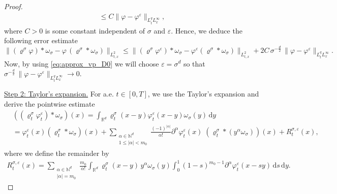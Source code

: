 \documentclass[reqno, 11pt]{amsart}
\numberwithin{equation}{section}
\theoremstyle{definition}
\begin{document}
\begin{proof}
\begin{align*}
        \leq C\|\varphi-\varphi^\varepsilon\|_{L_t^q L_x^\infty},
    \end{align*}
    where $C>0$ is some constant independent of $\sigma$ and $\varepsilon$. Hence, we deduce the following error estimate
    \begin{equation}\label{eq:commutator_proof_before_Taylors_expansion_regularization}
        \|(\varrho^\sigma\varphi)\ast\omega_\sigma-\varphi\,(\varrho^\sigma\ast\omega_\sigma)\|_{L_{t,x}^2}\leq \|(\varrho^\sigma\varphi^\varepsilon)\ast\omega_\sigma-\varphi^\varepsilon (\varrho^\sigma\ast\omega_\sigma)\|_{L_{t,x}^2}\!+\!2C\,\sigma^{-\frac{d}{2}}\,\|\varphi-\varphi^\varepsilon\|_{L_t^q L_x^\infty}.
    \end{equation}
    Now, by using \eqref{eq:approx_vp_D0} we will choose $\varepsilon=\sigma^d$ so that $\sigma^{-\frac{d}{2}}\,\|\varphi-\varphi^\varepsilon\|_{L_t^q L_x^\infty} \to 0$.
    
    \underline{Step 2: Taylor's expansion.} For a.e. $t\in [0,T]$, we use the Taylor's expansion and derive the pointwise estimate
    \begin{equation}\label{eq:Taylor_proof_commutator_estimate_Step2_sect4}
        \begin{split}
            &((\varrho_t^\sigma\varphi_t^\varepsilon)\ast \omega_\sigma)(x)
            =\int_{\mathbb{R}^{d}}\varrho_t^\sigma(x-y)\varphi_t^\varepsilon(x-y)\omega_\sigma(y)\,\mathrm{d} y\\
            &=\varphi_t^\varepsilon(x) (\varrho_t^\sigma\ast\omega_\sigma)(x)+\sum_{\substack{\alpha\in\mathbb{N}^d \\ 1\leq |\alpha|<m_0}}\frac{(-1)^{|\alpha|}}{\alpha!}\partial^\alpha\varphi_t^\varepsilon(x)\; (\varrho_t^\sigma\ast (y^\alpha \omega_\sigma))(x)
            +R_t^{\sigma,\varepsilon}(x),
        \end{split}
    \end{equation}
    where we define the remainder by
    \begin{align*}
        R_t^{\sigma,\varepsilon}(x)
        =\sum_{\substack{\alpha\in\mathbb{N}^d \\ |\alpha|=m_0}}\frac{m_0}{\alpha!}\int_{\mathbb{R}^{d}} \varrho_t^\sigma(x-y) \,y^\alpha\omega_\sigma(y)\int_0^1 (1-s)^{m_0-1}\partial^\alpha \varphi_t^\varepsilon(x-s y)\,\mathrm{d} s\,\mathrm{d} y.
    \end{align*}


\end{proof}
\end{document}
